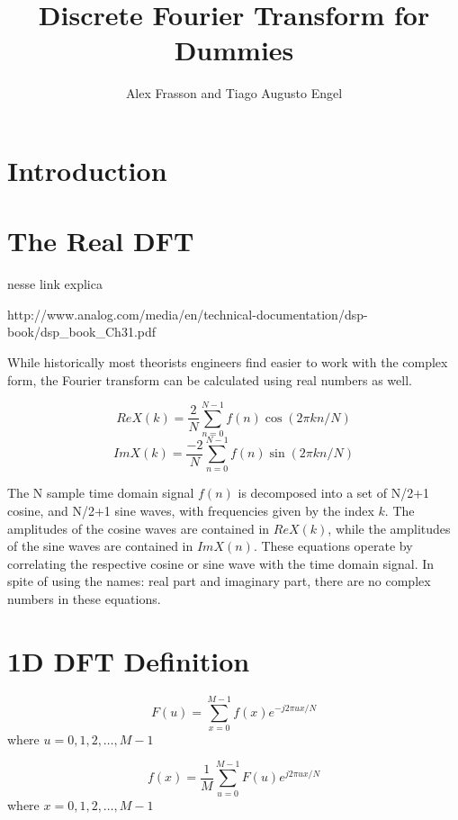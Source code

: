 \documentclass[12pt]{article}
\title{Discrete Fourier Transform for Dummies}
\author{Alex Frasson and Tiago Augusto Engel\inst{1}}
\begin{document}
 
\maketitle

\section{Introduction}

\section{The Real DFT}

nesse link explica 

http://www.analog.com/media/en/technical-documentation/dsp-book/dsp\_book\_Ch31.pdf

While historically most theorists engineers find easier to work with the complex form, the Fourier transform can be calculated using real numbers as well. 

\begin{equation}
ReX(k)=\frac{2}{N} \sum_{n=0}^{N-1}f(n) \cos(2\pi kn/N)
\end{equation}
\begin{equation}
ImX(k)=\frac{-2}{N} \sum_{n=0}^{N-1}f(n) \sin(2\pi kn/N)
\end{equation}

The N sample time domain signal $f(n)$ is decomposed into a set of N/2+1 cosine, and N/2+1 sine waves, with frequencies given by the index $k$. The amplitudes of the cosine waves are contained in $ReX(k)$, while the amplitudes of the sine waves are contained in $ImX(n)$. These  equations operate by correlating the respective cosine or sine wave with the time domain signal.  In spite of using the names: real part and imaginary part, there are no complex  numbers in these equations\cite{Analog2016}.


\section{1D DFT Definition}
\begin{equation}
F(u)=\sum_{x=0}^{M-1}f(x) e^{-j 2\pi u x / N}
\end{equation}
where $u = 0,1,2,\dots, M-1$

\begin{equation}
f(x)=\frac{1}{M}\sum_{u=0}^{M-1}F(u) e^{j 2\pi u x / N}
\end{equation}
where $x = 0,1,2,\dots, M-1$
\end{document}
